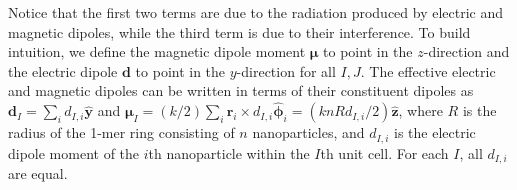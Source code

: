 \documentclass[journal=apchd5,manuscript=article]{achemso}
\begin{document}
Notice that the first two terms are due to the radiation produced by electric and magnetic dipoles, while the third term is due to their interference. To build intuition, we define the magnetic dipole moment $\boldsymbol{\mu}$ to point in the $z$-direction and the electric dipole $\textbf{d}$ to point in the $y$-direction for all $I,J.$ The effective electric and magnetic dipoles can be written in terms of their constituent dipoles as $\textbf{d}_I = \sum_i d_{I,i} \hat{\textbf{y}}$ and $\boldsymbol{\mu}_I = ({k}/{2})\sum_i\textbf{r}_i \times d_{I,i} \hat{\boldsymbol{\phi}}_i = ({knRd_{I,i}}/{2})\hat{\textbf{z}}$, where $R$ is the radius of the 1-mer ring consisting of $n$ nanoparticles, and $d_{I,i}$ is the electric dipole moment of the $i$th nanoparticle within the $I$th unit cell. For each $I$, all $d_{I,i}$ are equal.
\end{document}
